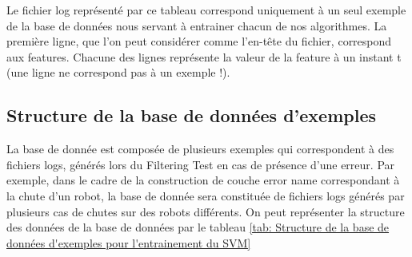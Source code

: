 Le fichier log représenté par ce tableau correspond uniquement à un seul exemple de la base de données nous servant à entrainer chacun de nos algorithmes. 
La première ligne, que l'on peut considérer comme l'en-tête du fichier, correspond aux features. Chacune des lignes représente la valeur de la feature à un instant t (une ligne ne correspond pas à un exemple !). 

\subsection{Structure de la base de données d'exemples}
\label{Automatisation du processus d'investigation: Achitecture High Level du système proposé: Structure de la base de données d'exemples}
La base de donnée est composée de plusieurs exemples qui correspondent à des fichiers logs, générés lors du Filtering Test en cas de présence d'une erreur. Par exemple, dans le cadre de la construction de couche error name correspondant à la chute d'un robot, la base de donnée sera constituée de fichiers logs générés par plusieurs cas de chutes sur des robots différents. On peut représenter la structure des données de la base de données par le tableau \ref {tab: Structure de la base de données d'exemples pour l'entrainement du SVM}

